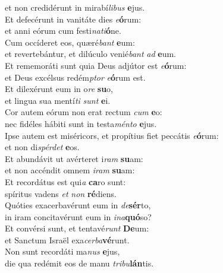 \evenverse et non credidérunt in mirabí\textit{li}\textit{bus} \textbf{e}jus.\\
\oddverse Et defecérunt in vanitáte dies \textit{e}\textbf{ó}rum:~\*\\
\oddverse et anni eórum cum festi\textit{na}\textit{ti}\textbf{ó}ne.\\
\evenverse Cum occíderet eos, quæré\textit{bant} \textbf{e}um:~\*\\
\evenverse et revertebántur, et dilúculo venié\textit{bant} \textit{ad} \textbf{e}um.\\
\oddverse Et rememoráti sunt quia Deus adjútor est \textit{e}\textbf{ó}rum:~\*\\
\oddverse et Deus excélsus redém\textit{ptor} \textit{e}\textbf{ó}rum est.\\
\evenverse Et dilexérunt eum in o\textit{re} \textbf{su}o,~\*\\
\evenverse et lingua sua mentí\textit{ti} \textit{sunt} \textbf{e}i.\\
\oddverse Cor autem eórum non erat rectum \textit{cum} \textbf{e}o:~\*\\
\oddverse nec fidéles hábiti sunt in testa\textit{mén}\textit{to} \textbf{e}jus.\\
\evenverse Ipse autem est miséricors, et propítius fiet peccátis \textit{e}\textbf{ó}rum:~\*\\
\evenverse et non di\textit{spér}\textit{det} \textbf{e}os.\\
\oddverse Et abundávit ut avérteret i\textit{ram} \textbf{su}am:~\*\\
\oddverse et non accéndit omnem \textit{i}\textit{ram} \textbf{su}am:\\
\evenverse Et recordátus est qui\textit{a} \textbf{ca}ro sunt:~\*\\
\evenverse spíritus vadens \textit{et} \textit{non} \textbf{ré}diens.\\
\oddverse Quóties exacerbavérunt eum in \textit{de}\textbf{sér}to,~\*\\
\oddverse in iram concitavérunt eum in \textit{i}\textit{na}\textbf{quó}so?\\
\evenverse Et convérsi sunt, et tentavé\textit{runt} \textbf{De}um:~\*\\
\evenverse et Sanctum Israël exa\textit{cer}\textit{ba}\textbf{vé}runt.\\
\oddverse Non sunt recordáti ma\textit{nus} \textbf{e}jus,~\*\\
\oddverse die qua redémit eos de manu \textit{tri}\textit{bu}\textbf{lán}tis.\\
